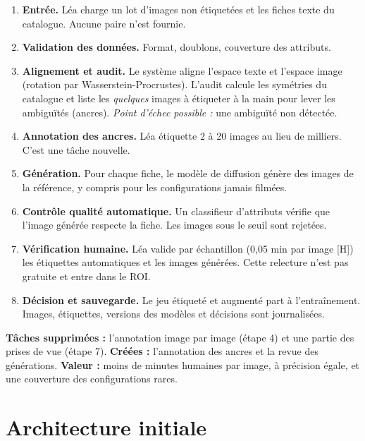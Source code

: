 \documentclass[10pt,a4paper]{article}
\begin{document}
\begin{enumerate}
\item \textbf{Entrée.} Léa charge un lot d'images non étiquetées et les fiches texte du catalogue. Aucune paire n'est fournie.
\item \textbf{Validation des données.} Format, doublons, couverture des attributs.
\item \textbf{Alignement et audit.} Le système aligne l'espace texte et l'espace image (rotation par Wasserstein-Procrustes). L'audit calcule les symétries du catalogue et liste les \emph{quelques} images à étiqueter à la main pour lever les ambiguïtés (ancres). \emph{Point d'échec possible :} une ambiguïté non détectée.
\item \textbf{Annotation des ancres.} Léa étiquette 2 à 20 images au lieu de milliers. C'est une tâche nouvelle.
\item \textbf{Génération.} Pour chaque fiche, le modèle de diffusion génère des images de la référence, y compris pour les configurations jamais filmées.
\item \textbf{Contrôle qualité automatique.} Un classifieur d'attributs vérifie que l'image générée respecte la fiche. Les images sous le seuil sont rejetées.
\item \textbf{Vérification humaine.} Léa valide par échantillon (0,05 min par image [H]) les étiquettes automatiques et les images générées. Cette relecture n'est pas gratuite et entre dans le ROI.
\item \textbf{Décision et sauvegarde.} Le jeu étiqueté et augmenté part à l'entraînement. Images, étiquettes, versions des modèles et décisions sont journalisées.
\end{enumerate}
\textbf{Tâches supprimées :} l'annotation image par image (étape 4) et une partie des prises de vue (étape 7). \textbf{Créées :} l'annotation des ancres et la revue des générations. \textbf{Valeur :} moins de minutes humaines par image, à précision égale, et une couverture des configurations rares.

\section{Architecture initiale}
\end{document}
